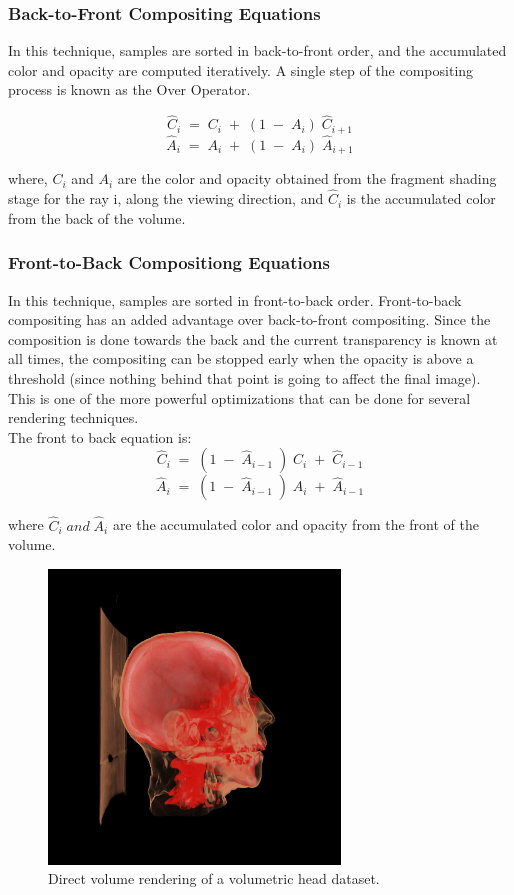 \subsubsection{Back-to-Front Compositing Equations}

In this technique, samples are sorted in back-to-front order, and the accumulated color and opacity are computed iteratively. A single step of the compositing process is known as the Over Operator. 
 
\begin{equation}
\hat{C}_i \; = \; C_i \; + \; (1 \; - \; A_i ) \; \hat{C}_{i+1} 
\end{equation}
\begin{equation}
\hat{A}_i \; = \; A_i \; + \; (1 \; - \; A_i ) \; \hat{A}_{i+1} 
\end{equation}

where, ${C}_i$ and ${A}_i$ are the color and opacity obtained from the fragment shading stage for the ray i, along the viewing direction, and $\hat{C}_i$ is the accumulated color from the back of the volume.

\subsubsection{Front-to-Back Compositiong Equations}
In this technique, samples are sorted in front-to-back order. Front-to-back compositing has an added advantage over back-to-front compositing. Since the composition is done towards the back and the current transparency is known at all times, the compositing can be stopped early when the opacity is above a threshold (since nothing behind that point is going to affect the final image). This is one of the more powerful optimizations that can be done for several rendering techniques. \\

The front to back equation is:
\begin{equation}
\hat{C}_i \; = \; (1 \; - \; \hat{A}_{i-1} \; ) \; C_i \; + \; \hat{C}_{i-1}    
\end{equation}
\begin{equation}
\hat{A}_i \; = \; (1 \; - \; \hat{A}_{i-1} \; ) \; A_i \; + \; \hat{A}_{i-1}    
\end{equation}

where $\hat{C}_i \; and \; \hat{A}_i$ are the accumulated color and opacity from the front of the volume. 


\begin{figure}[h]
\centering
\includegraphics[width=220pt]{Images/dvr_head.png}
\caption{\label{fig:ray_cast1.jpg} Direct volume rendering of a volumetric head dataset.}
\end{figure}


